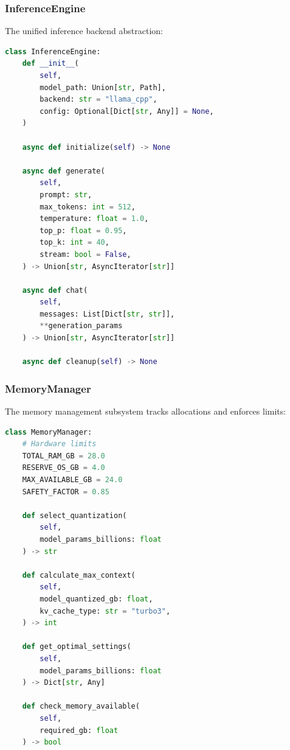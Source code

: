 \subsubsection{InferenceEngine}

The unified inference backend abstraction:

\begin{lstlisting}[language=Python, caption=InferenceEngine Interface]
class InferenceEngine:
    def __init__(
        self,
        model_path: Union[str, Path],
        backend: str = "llama_cpp",
        config: Optional[Dict[str, Any]] = None,
    )
    
    async def initialize(self) -> None
    
    async def generate(
        self,
        prompt: str,
        max_tokens: int = 512,
        temperature: float = 1.0,
        top_p: float = 0.95,
        top_k: int = 40,
        stream: bool = False,
    ) -> Union[str, AsyncIterator[str]]
    
    async def chat(
        self,
        messages: List[Dict[str, str]],
        **generation_params
    ) -> Union[str, AsyncIterator[str]]
    
    async def cleanup(self) -> None
\end{lstlisting}

\subsubsection{MemoryManager}

The memory management subsystem tracks allocations and enforces limits:

\begin{lstlisting}[language=Python, caption=MemoryManager Key Methods]
class MemoryManager:
    # Hardware limits
    TOTAL_RAM_GB = 28.0
    RESERVE_OS_GB = 4.0
    MAX_AVAILABLE_GB = 24.0
    SAFETY_FACTOR = 0.85
    
    def select_quantization(
        self,
        model_params_billions: float
    ) -> str
    
    def calculate_max_context(
        self,
        model_quantized_gb: float,
        kv_cache_type: str = "turbo3",
    ) -> int
    
    def get_optimal_settings(
        self,
        model_params_billions: float
    ) -> Dict[str, Any]
    
    def check_memory_available(
        self,
        required_gb: float
    ) -> bool
\end{lstlisting}

